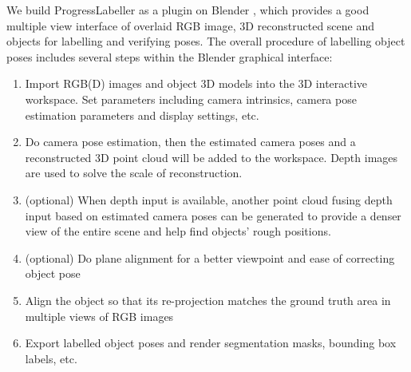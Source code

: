 We build ProgressLabeller as a plugin on Blender \cite{blender}, which provides a good multiple view interface of overlaid RGB image, 3D reconstructed scene and objects for labelling and verifying poses. The overall procedure of labelling object poses includes several steps within the Blender graphical interface: 
\begin{enumerate}
    \item Import RGB(D) images and object 3D models into the 3D interactive workspace. Set parameters including camera intrinsics, camera pose estimation parameters and display settings, etc.
    \item Do camera pose estimation, then the estimated camera poses and a reconstructed 3D point cloud will be added to the workspace. Depth images are used to solve the scale of reconstruction.
    \item (optional) When depth input is available, another point cloud fusing depth input based on estimated camera poses can be generated to provide a denser view of the entire scene and help find objects' rough positions.
    \item (optional) Do plane alignment for a better viewpoint and ease of correcting object pose
    \item Align the object so that its re-projection matches the ground truth area in multiple views of RGB images
    \item Export labelled object poses and render segmentation masks, bounding box labels, etc.
\end{enumerate}

